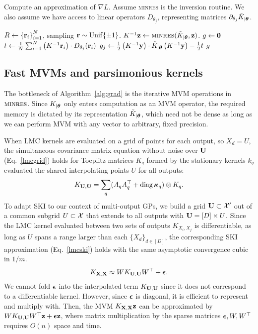 \documentclass{article}
\begin{document}
\begin{algorithm}[!ht]
  \caption{Compute an approximation of $\nabla L$. Assume \textsc{minres} is the inversion routine. We also assume we have access to linear operators $D_{\theta_j}$, representing matrices $\partial_{\theta_j}\tilde{K}_{|{\boldsymbol\theta}}$.} \label{alg:grad}
\begin{algorithmic}[1]
  \State $R\gets\left\{ {\textbf{r}}_i \right\}_{ i=1 }^{ N }$, sampling ${\textbf{r}}\sim\operatorname{Unif}\{\pm 1\}$.
\State $K^{-1}\textbf{z}\gets\textsc{minres}(\tilde{K}_{|{\boldsymbol\theta}},\textbf{z})$.
\EndFor
\State $g\gets \textbf{0}$
\State $t\gets \frac{1}{N}\sum_{i=1}^{N}\left({K^{-1}{\textbf{r}}_i}\right)\cdot D_{\theta_j}({\textbf{r}}_i)$
\State $g_j\gets \frac{1}{2}\left({K^{-1}\textbf{y}}\right)\cdot \tilde{K}_{|{\boldsymbol\theta}}\left({K^{-1}\textbf{y}}\right)-\frac{1}{2}t$
\EndFor
\State \Return $g$ 
\EndProcedure
\end{algorithmic}
\end{algorithm}

\subsection{Fast MVMs and parsimonious kernels}\label{fast-mvm}

The bottleneck of Algorithm~\ref{alg:grad} is the iterative MVM operations in $\textsc{minres}$. Since $K_{|{\boldsymbol\theta}}$ only enters computation as an MVM operator, the required memory is dictated by its representation $\tilde{K}_{|{\boldsymbol\theta}}$, which need not be dense as long as we can perform MVM with any vector to arbitrary, fixed precision.

When LMC kernels are evaluated on a grid of points for each output, so $X_d=U$, the simultaneous covariance matrix equation without noise over $\textbf{U}$  (Eq.~\ref{lmcgrid}) holds for Toeplitz matrices $K_q$ formed by the stationary kernels $k_q$ evaluated the shared interpolating points $U$ for all outputs:
\begin{align}
  K_{\textbf{U},\textbf{U}}=\sum_q(A_qA_q^\top+\operatorname{diag}{\boldsymbol\kappa}_q)\otimes K_q\label{lmcgrid}.
\end{align}
To adapt SKI to our context of multi-output GPs, we build a grid $\textbf{U}\subset\mathcal{X}'$ out of a common subgrid $U\subset\mathcal{X}$ that extends to all outputs with $\textbf{U} = [D]\times U$. Since the LMC kernel evaluated between two sets of outputs $K_{X_i,X_j}$ is differentiable, as long as $U$ spans a range larger than each $\{X_d\}_{d\in[D]}$, the corresponding SKI approximation (Eq.~\ref{lmcski}) holds with the same asymptotic convergence cubic in $1/m$.
\begin{align}
  K_{\textbf{X},\textbf{X}}\approx WK_{\textbf{U},\textbf{U}}W^\top+{\boldsymbol\epsilon}.\label{lmcski}
\end{align}
We cannot fold ${\boldsymbol\epsilon}$ into the interpolated term $K_{\textbf{U},\textbf{U}}$ since it does not correspond to a differentiable kernel. However, since ${\boldsymbol\epsilon}$ is diagonal, it is efficient to represent and multiply with. Then, the MVM $K_{\textbf{X},\textbf{X}}\textbf{z}$ can be approximated by $WK_{\textbf{U},\textbf{U}}W^\top\textbf{z}+{\boldsymbol\epsilon}\textbf{z}$, where matrix multiplication by the sparse matrices ${\boldsymbol\epsilon}, W,W^\top$ requires $O(n)$ space and time.
\end{document}
